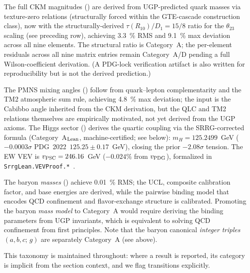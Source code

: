 \documentclass[11pt]{article}
\theoremstyle{remark}
\begin{document}
\begin{description}[leftmargin=1.2em,labelindent=0em,itemsep=0.3em]
\item[Category A/D: Derived CKM matrix.]
The full CKM magnitudes () are derived from UGP-predicted quark masses via texture-zero relations (structurally forced within the GTE-cascade construction class), now with the structurally-derived $\tau(R_{10})/D_1 = 15/8$ ratio for the $\theta_{23}$ scaling (see preceding row), achieving \SI{3.3}{\percent} RMS and \SI{9.1}{\percent} max deviation across all nine elements.
The structural ratio is Category~A; the per-element residuals across all nine matrix entries remain Category~A/D pending a full Wilson-coefficient derivation.
(A PDG-lock verification artifact is also written for reproducibility but is not the derived prediction.)

\item[Category A/D: Mixed-status sectors.]
The PMNS mixing angles () follow from quark--lepton complementarity and the TM2 atmospheric sum rule, achieving \SI{4.8}{\percent} max deviation; the input is the Cabibbo angle inherited from the CKM derivation, but the QLC and TM2 relations themselves are empirically motivated, not yet derived from the UGP axioms.
The Higgs sector () derives the quartic coupling via the SRRG-corrected formula (Category~A$_{\rm Lean}$, machine-certified; see below): $m_H = 125.2499$~GeV ($-0.0003\sigma$ PDG~2022~$125.25\pm0.17$~GeV), closing the prior $-2.08\sigma$ tension.  The EW VEV is $v_{\rm PSC} = 246.16$~GeV ($-0.024\%$ from $v_{\rm PDG}$), formalized in \texttt{SrrgLean.VEVProof.*}~\cite{SpivackSRRG}.

\item[Category B: Calibrated quantities.]
The baryon \emph{masses} () achieve \SI{0.01}{\percent} RMS; the UCL, composite calibration factor, and base energies are derived, while the pairwise binding model that encodes QCD confinement and flavor-exchange structure is calibrated.
Promoting the baryon \emph{mass model} to Category~A would require deriving the binding parameters from UGP invariants, which is equivalent to solving QCD confinement from first principles.
Note that the baryon canonical \emph{integer triples} $(a,b,c;\,g)$ are separately Category~A (see above).
\end{description}

\noindent This taxonomy is maintained throughout: where a result is reported, its category is implicit from the section context, and we flag transitions explicitly.
\end{document}
